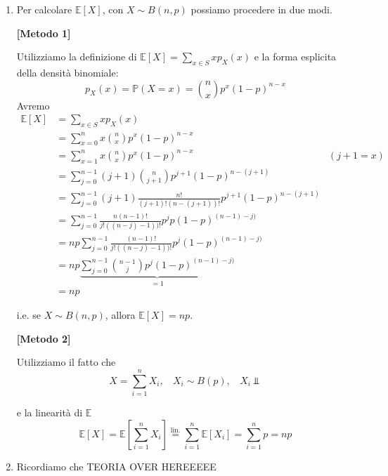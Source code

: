 \begin{enumerate}
\item Per calcolare $\mathbb{E}[ X]$, con $X\sim B( n,p)$ possiamo procedere in due modi.

\textbf{[Metodo 1]}

Utilizziamo la definizione di $\mathbb{E}[ X] =\sum\limits _{x\in S} xp_{X}( x)$ e la forma esplicita della densità binomiale:\begin{equation*}
p_{X}( x) =\mathbb{P}( X=x) =\binom{n}{x} p^{x}( 1-p)^{n-x}
\end{equation*}Avremo\begin{equation*}
\begin{aligned}
\mathbb{E}[ X] & =\sum\limits _{x\in S} xp_{X}( x) & \\
 & =\sum\limits _{x=0}^{n} x\binom{n}{x} p^{x}( 1-p)^{n-x} & \\
 & =\sum\limits _{x=1}^{n} x\binom{n}{x} p^{x}( 1-p)^{n-x} & ( j+1=x)\\
 & =\sum\limits _{j=0}^{n-1}( j+1)\binom{n}{j+1} p^{j+1}( 1-p)^{n-( j+1)} & \\
 & =\sum\limits _{j=0}^{n-1}( j+1)\frac{n!}{( j+1) !( n-( j+1)) !} p^{j+1}( 1-p)^{n-( j+1)} & \\
 & =\sum\limits _{j=0}^{n-1}\frac{n( n-1) !}{j!(( n-j) -1)) !} p^{j} p( 1-p)^{( n-1) -j)} & \\
 & =np\sum\limits _{j=0}^{n-1}\frac{( n-1) !}{j!(( n-j) -1)) !} p^{j}( 1-p)^{( n-1) -j)} & \\
 & =np\underbrace{\sum\limits _{j=0}^{n-1}\binom{n-1}{j} p^{j}( 1-p)^{( n-1) -j)}}_{=1} & \\
 & =np & 
\end{aligned}
\end{equation*}

i.e. se $X\sim B( n,p)$, allora $\boxed{\mathbb{E}[ X] =np}$.

\textbf{[Metodo 2]}

Utilizziamo il fatto che\begin{equation*}
X=\sum\limits _{i=1}^{n} X_{i} ,\ \ \ \ X_{i} \sim B( p) ,\ \ \ \ X_{i} \Bot 
\end{equation*}

e la linearità di $\mathbb{E}$\begin{equation*}
\mathbb{E}[ X] =\mathbb{E}\left[\sum\limits _{i=1}^{n} X_{i}\right]\overset{\text{lin.}}{=}\sum\limits _{i=1}^{n}\mathbb{E}[ X_{i}] =\sum\limits _{i=1}^{n} p=np
\end{equation*}
\item Ricordiamo che TEORIA OVER HEREEEEE


\end{enumerate}
